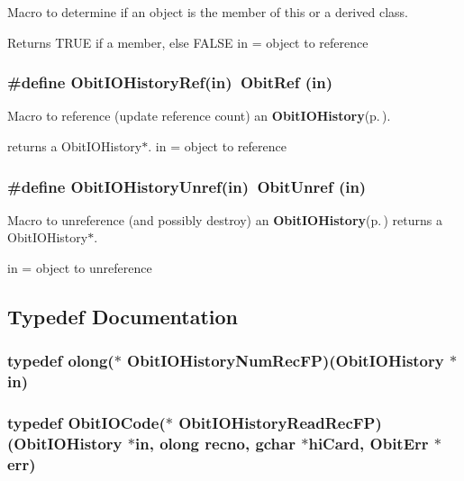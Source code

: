 Macro to determine if an object is the member of this or a derived class. 

Returns TRUE if a member, else FALSE in = object to reference 
\subsubsection{\setlength{\rightskip}{0pt plus 5cm}\#define Obit\-IOHistory\-Ref(in)\ Obit\-Ref (in)}\label{ObitIOHistory_8h_a1}


Macro to reference (update reference count) an {\bf Obit\-IOHistory}{\rm (p.\,\pageref{structObitIOHistory})}. 

returns a Obit\-IOHistory$\ast$. in = object to reference 
\subsubsection{\setlength{\rightskip}{0pt plus 5cm}\#define Obit\-IOHistory\-Unref(in)\ Obit\-Unref (in)}\label{ObitIOHistory_8h_a0}


Macro to unreference (and possibly destroy) an {\bf Obit\-IOHistory}{\rm (p.\,\pageref{structObitIOHistory})} returns a Obit\-IOHistory$\ast$. 

in = object to unreference 

\subsection{Typedef Documentation}
\subsubsection{\setlength{\rightskip}{0pt plus 5cm}typedef {\bf olong}($\ast$ {\bf Obit\-IOHistory\-Num\-Rec\-FP})({\bf Obit\-IOHistory} $\ast$in)}\label{ObitIOHistory_8h_a5}


\subsubsection{\setlength{\rightskip}{0pt plus 5cm}typedef Obit\-IOCode($\ast$ {\bf Obit\-IOHistory\-Read\-Rec\-FP})({\bf Obit\-IOHistory} $\ast$in, {\bf olong} recno, gchar $\ast$hi\-Card, {\bf Obit\-Err} $\ast$err)}\label{ObitIOHistory_8h_a3}


